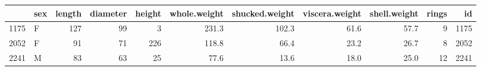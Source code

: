 
\begin{tabular}{l|l|r|r|r|r|r|r|r|r|r}
\hline
  & sex & length & diameter & height & whole.weight & shucked.weight & viscera.weight & shell.weight & rings & id\\
\hline
1175 & F & 127 & 99 & 3 & 231.3 & 102.3 & 61.6 & 57.7 & 9 & 1175\\
\hline
2052 & F & 91 & 71 & 226 & 118.8 & 66.4 & 23.2 & 26.7 & 8 & 2052\\
\hline
2241 & M & 83 & 63 & 25 & 77.6 & 13.6 & 18.0 & 25.0 & 12 & 2241\\
\hline
\end{tabular}
